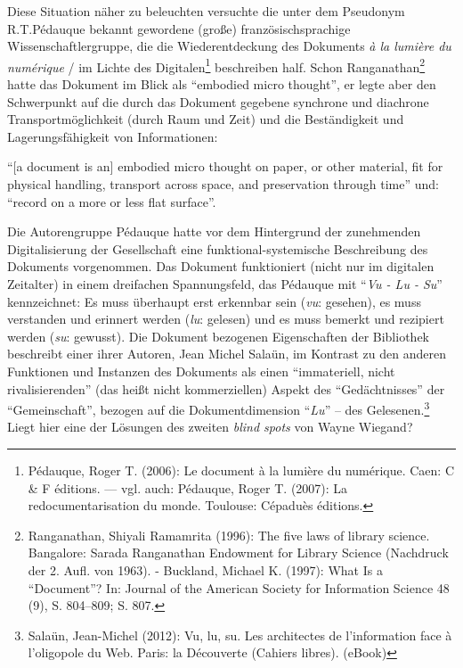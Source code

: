 Diese Situation näher zu beleuchten versuchte die unter dem Pseudonym
R.T.Pédauque bekannt gewordene (große) französischsprachige
Wissenschaftlergruppe, die die Wiederentdeckung des Dokuments \emph{à la
lumière du numérique} / im Lichte des Digitalen\footnote{Pédauque, Roger
  T. (2006): Le document à la lumière du numérique. Caen: C \& F
  éditions. --- vgl. auch: Pédauque, Roger T. (2007): La
  redocumentarisation du monde. Toulouse: Cépaduès éditions.}
beschreiben half. Schon Ranganathan\footnote{Ranganathan, Shiyali
  Ramamrita (1996): The five laws of library science. Bangalore: Sarada
  Ranganathan Endowment for Library Science (Nachdruck der 2. Aufl. von
  1963). - Buckland, Michael K. (1997): What Is a \enquote{Document}?
  In: Journal of the American Society for Information Science 48 (9), S.
  804--809; S. 807.} hatte das Dokument im Blick als \enquote{embodied
micro thought}, er legte aber den Schwerpunkt auf die durch das Dokument
gegebene synchrone und diachrone Transportmöglichkeit (durch Raum und
Zeit) und die Beständigkeit und Lagerungsfähigkeit von Informationen:

\enquote{{[}a document is an{]} embodied micro thought on paper, or
other material, fit for physical handling, transport across space, and
preservation through time} und: \enquote{record on a more or less flat
surface}.

Die Autorengruppe Pédauque hatte vor dem Hintergrund der zunehmenden
Digitalisierung der Gesellschaft eine funktional-systemische
Beschreibung des Dokuments vorgenommen. Das Dokument funktioniert (nicht
nur im digitalen Zeitalter) in einem dreifachen Spannungsfeld, das
Pédauque mit \enquote{\emph{Vu - Lu - Su}} kennzeichnet: Es muss
überhaupt erst erkennbar sein (\emph{vu}: gesehen), es muss verstanden
und erinnert werden (\emph{lu}: gelesen) und es muss bemerkt und
rezipiert werden (\emph{su}: gewusst). Die Dokument bezogenen
Eigenschaften der Bibliothek beschreibt einer ihrer Autoren, Jean Michel
Salaün, im Kontrast zu den anderen Funktionen und Instanzen des
Dokuments als einen \enquote{immateriell, nicht rivalisierenden} (das
heißt nicht kommerziellen) Aspekt des \enquote{Gedächtnisses} der
\enquote{Gemeinschaft}, bezogen auf die Dokumentdimension
\enquote{\emph{Lu}} -- des Gelesenen.\footnote{Salaün, Jean-Michel
  (2012): Vu, lu, su. Les architectes de l'information face à
  l'oligopole du Web. Paris: la Découverte (Cahiers libres). (eBook)}
Liegt hier eine der Lösungen des zweiten \emph{blind spots} von Wayne
Wiegand?

